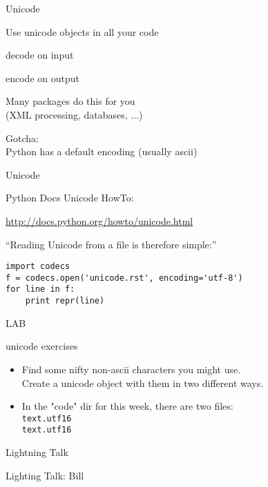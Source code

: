 \documentclass{beamer}
\begin{document}
\begin{frame}[fragile]{Unicode}

{\Large
Use unicode objects in all your code

\vfill
decode on input

\vfill
encode on output

\vfill
Many packages do this for you\\
\hspace{0.25in} (XML processing, databases, ...)

\vfill
Gotcha:\\
\hspace{0.25in} Python has a default encoding (usually ascii)
}
\end{frame}

\begin{frame}[fragile]{Unicode}

{\Large Python Docs Unicode HowTo:}

\url{http://docs.python.org/howto/unicode.html}

\vfill
``Reading Unicode from a file is therefore simple:''

\begin{verbatim}
import codecs
f = codecs.open('unicode.rst', encoding='utf-8')
for line in f:
    print repr(line)
\end{verbatim}

\end{frame}


\begin{frame}[fragile]{LAB}

{\Large unicode exercises}
\begin{itemize}
  \item Find some nifty non-ascii characters you might use.\\
Create a unicode object with them in two different ways.
  \item In the "code" dir for this week, there are two files:\\
        \verb|text.utf16| \\
        \verb|text.utf16| \\
\end{itemize}

\end{frame}

\begin{frame}{Lightning Talk}

{\center

\LARGE Lighting Talk:
\vfill
Bill
\vfill

}
\end{frame}
\end{document}

